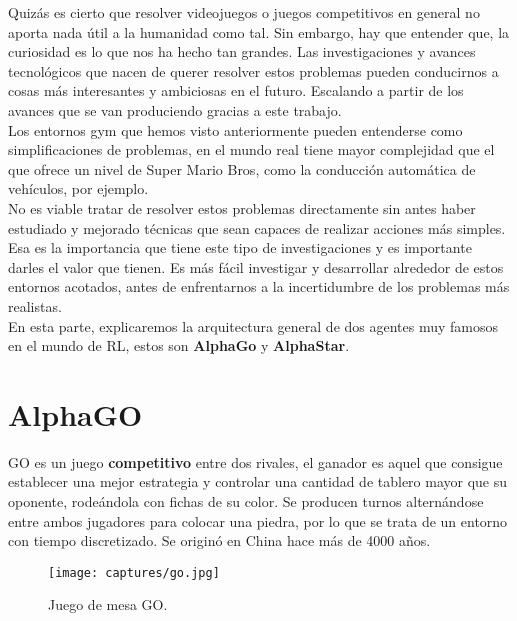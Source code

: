 \documentclass[11pt,fleqn]{book} %
\begin{document}
Quizás es cierto que resolver videojuegos o juegos competitivos en general no aporta nada útil a la humanidad como tal. Sin embargo, hay que entender que, la curiosidad es lo que nos ha hecho tan grandes. Las investigaciones y avances tecnológicos que nacen de querer resolver estos problemas pueden conducirnos a cosas más interesantes y ambiciosas en el futuro. Escalando a partir de los avances que se van produciendo gracias a este trabajo. \\

Los entornos gym que hemos visto anteriormente pueden entenderse como simplificaciones de problemas, en el mundo real tiene mayor complejidad que el que ofrece un nivel de Super Mario Bros, como la conducción automática de vehículos, por ejemplo. \\

No es viable tratar de resolver estos problemas directamente sin antes haber estudiado y mejorado técnicas que sean capaces de realizar acciones más simples. Esa es la importancia que tiene este tipo de investigaciones y es importante darles el valor que tienen. Es más fácil investigar y desarrollar alrededor de estos entornos acotados, antes de enfrentarnos a la incertidumbre de los problemas más realistas. \\

En esta parte, explicaremos la arquitectura general de dos agentes muy famosos en el mundo de RL, estos son \textbf{AlphaGo} y \textbf{AlphaStar}.

\chapter{AlphaGO}

GO es un juego \textbf{competitivo} entre dos rivales, el ganador es aquel que consigue establecer una mejor estrategia y controlar una cantidad de tablero mayor que su oponente, rodeándola con fichas de su color. Se producen turnos alternándose entre ambos jugadores para colocar una piedra, por lo que se trata de un entorno con tiempo discretizado. Se originó en China hace más de 4000 años. \cite{book:alphago} \cite{article:vinyals} \cite{article:vinyals2}

\begin{figure}[H]
	\centering\texttt{[image: captures/go.jpg]}
	\caption{Juego de mesa GO.}
	\label{fig:gotablero} %
\end{figure}
\end{document}
